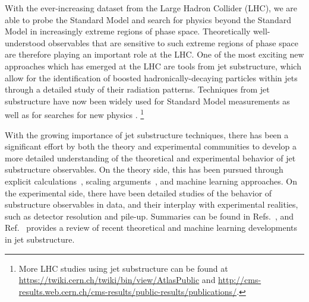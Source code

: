 \documentclass[11pt]{cernrep}
\begin{document}
With the ever-increasing dataset from the Large Hadron Collider (LHC), we are able to probe the Standard Model and search for physics beyond the Standard Model in increasingly extreme regions of phase space.
%
Theoretically well-understood observables that are sensitive to such extreme regions of phase space are therefore playing an important role at the LHC.
%
One of the most exciting new approaches which has emerged at the LHC are tools from jet substructure, which allow for the identification of boosted hadronically-decaying particles within jets through a detailed study of their radiation patterns.
%
Techniques from jet substructure have now been widely used for Standard Model measurements \cite{Chatrchyan:2012sn,CMS:2013cda,Aad:2015cua,Aad:2015lxa,ATLAS-CONF-2015-035,Aad:2015rpa,Aad:2015hna,ATLAS-CONF-2016-002,ATLAS-CONF-2016-039,ATLAS-CONF-2016-034,CMS-PAS-TOP-16-013,CMS-PAS-HIG-16-004} as well as for searches for new physics  \cite{CMS:2011bqa,Fleischmann:2013woa,Pilot:2013bla,TheATLAScollaboration:2013qia,Chatrchyan:2012ku,CMS-PAS-B2G-14-001,CMS-PAS-B2G-14-002,Khachatryan:2015axa,Khachatryan:2015bma,Aad:2015owa,Aaboud:2016okv,Aaboud:2016trl,Aaboud:2016qgg,ATLAS-CONF-2016-055,ATLAS-CONF-2015-071,ATLAS-CONF-2015-068,CMS-PAS-EXO-16-037,CMS-PAS-EXO-16-040,Khachatryan:2016mdm,CMS-PAS-HIG-16-016,CMS-PAS-B2G-15-003,CMS-PAS-EXO-16-017}.%
\footnote{More LHC studies using jet substructure can be found at \url{https://twiki.cern.ch/twiki/bin/view/AtlasPublic} and \url{http://cms-results.web.cern.ch/cms-results/public-results/publications/}.} 

With the growing importance of jet substructure techniques, there has been a significant effort by both the theory and experimental communities to develop a more detailed understanding of the theoretical and experimental behavior of jet substructure observables.
%
On the theory side, this has been pursued through explicit calculations~\cite{Feige:2012vc,Field:2012rw,Dasgupta:2013ihk,Dasgupta:2013via,Larkoski:2014pca,Dasgupta:2015yua,Seymour:1997kj,Li:2011hy,Larkoski:2012eh,Jankowiak:2012na,Chien:2014nsa,Chien:2014zna,Isaacson:2015fra,Krohn:2012fg,Waalewijn:2012sv,Larkoski:2014tva,Procura:2014cba,Bertolini:2015pka,Bhattacherjee:2015psa,Larkoski:2015kga,Dasgupta:2015lxh,Frye:2016okc,Frye:2016aiz,Kang:2016ehg,Hornig:2016ahz,Marzani:2017mva,Marzani:2017kqd,Hoang:2017kmk,Larkoski:2017cqq,Larkoski:2017iuy}, scaling arguments~\cite{Walsh:2011fz,Larkoski:2014gra,Larkoski:2014zma}, and machine learning \cite{Cogan:2014oua,deOliveira:2015xxd,Almeida:2015jua,Baldi:2016fql,Guest:2016iqz,Conway:2016caq,Barnard:2016qma} approaches.
%
On the experimental side, there have been detailed studies of the behavior of substructure observables in data, and their interplay with experimental realities, such as detector resolution and pile-up.
%
Summaries can be found in Refs.~\cite{Abdesselam:2010pt,Altheimer:2012mn,Altheimer:2013yza,Adams:2015hiv}, and Ref.~\cite{Larkoski:2017jix} provides a review of recent theoretical and machine learning developments in jet substructure. 
\end{document}
